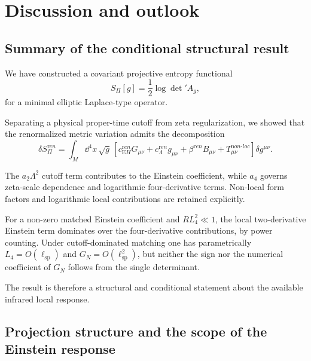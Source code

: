 \documentclass[pdflatex,sn-mathphys-num]{sn-jnl} %
\theoremstyle{remark}
\theoremstyle{plain}
\begin{document}
  \section{Discussion and outlook}
  \label{sec:discussion}

  \subsection{Summary of the conditional structural result}
    \label{subsec:summary}

    We have constructed a covariant projective entropy functional
    \begin{equation}
      S_\Pi[g] = \frac12 \log \det\nolimits' A_g ,
    \end{equation}
    for a minimal elliptic Laplace-type operator.

    Separating a physical proper-time cutoff from zeta regularization, we showed that the renormalized metric variation
    admits the decomposition
    \begin{equation}
      \delta S_\Pi^{\mathrm ren}
      =
      \int_M\dd^4x\,\sqrt{g}\,
      \left[
        c_{\mathrm EH}^{\mathrm ren}G_{\mu\nu}
        +c_\Lambda^{\mathrm ren}g_{\mu\nu}
        +\beta^{\mathrm ren}B_{\mu\nu}
        +T^{\mathrm non\mbox{-}loc}_{\mu\nu}
      \right]\delta g^{\mu\nu}.
    \end{equation}

    The $a_2\Lambda^2$ cutoff term contributes to the Einstein coefficient, while $a_4$ governs zeta-scale dependence
    and logarithmic four-derivative terms.
    Non-local form factors and logarithmic local contributions are retained explicitly.

    For a non-zero matched Einstein coefficient and $RL_4^2\ll1$, the local two-derivative Einstein term dominates over
    the four-derivative contributions, by power counting.
    Under cutoff-dominated matching one has parametrically $L_4=O(\ell_{\mathrm{sp}})$ and
    $G_N=O(\ell_{\mathrm{sp}}^2)$, but neither the sign nor the numerical coefficient of $G_N$ follows from the single
    determinant.

    The result is therefore a structural and conditional statement about the available infrared local response.

  \subsection{Projection structure and the scope of the Einstein response}
    \label{subsec:projection-structure}
\end{document}
